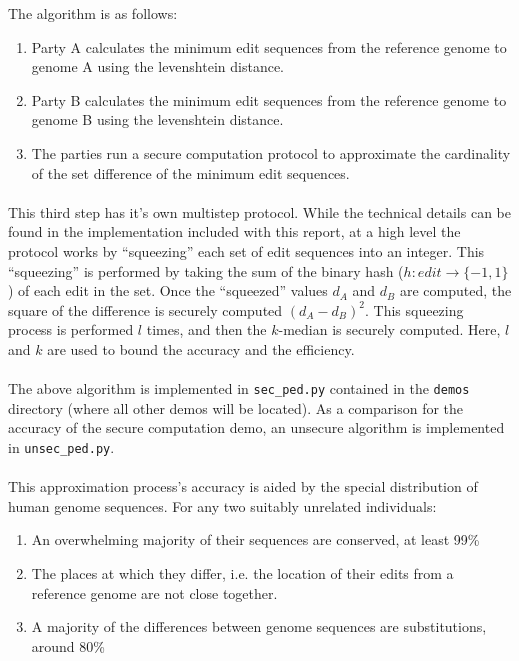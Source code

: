 The algorithm is as follows:

\begin{enumerate}
\item Party A calculates the minimum edit sequences from the reference genome to genome A using the levenshtein distance.
\item Party B calculates the minimum edit sequences from the reference genome to genome B using the levenshtein distance.
\item The parties run a secure computation protocol to approximate the cardinality of the set difference of the minimum edit sequences.
\end{enumerate}

\paragraph{}
This third step has it's own multistep protocol. While the technical details can be found in the implementation included with this report, at a high level the protocol works by ``squeezing'' each set of edit sequences into an integer. This ``squeezing'' is performed by taking the sum of the binary hash ($h : edit \rightarrow \{-1, 1\}$) of each edit in the set. Once the ``squeezed'' values $d_A$ and $d_B$ are computed, the square of the difference is securely computed $(d_A - d_B)^2$. This squeezing process is performed $l$ times, and then the $k$-median is securely computed. Here, $l$ and $k$ are used to bound the accuracy and the efficiency.

\paragraph{}
The above algorithm is implemented in \texttt{sec\_ped.py} contained in the \texttt{demos} directory (where all other demos will be located). As a comparison for the accuracy of the secure computation demo, an unsecure algorithm is implemented in \texttt{unsec\_ped.py}.

\paragraph{}
This approximation process's accuracy is aided by the special distribution of human genome sequences. For any two suitably unrelated individuals:

\begin{enumerate}
\item An overwhelming majority of their sequences are conserved, at least 99\%
\item The places at which they differ, i.e. the location of their edits from a reference genome are not close together.
\item A majority of the differences between genome sequences are substitutions, around 80\%
\end{enumerate}

